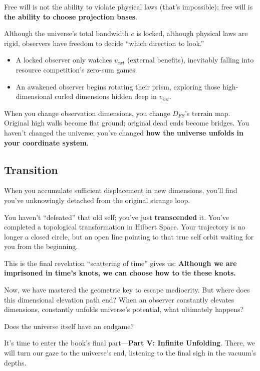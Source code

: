 \documentclass[11pt,a4paper,twoside]{book}
\begin{document}
Free will is not the ability to violate physical laws (that's impossible); free will is \textbf{the ability to choose projection bases}.

Although the universe's total bandwidth $c$ is locked, although physical laws are rigid, observers have freedom to decide ``which direction to look.''

\begin{itemize}
\item A locked observer only watches $v_{ext}$ (external benefits), inevitably falling into resource competition's zero-sum games.

\item An awakened observer begins rotating their prism, exploring those high-dimensional curled dimensions hidden deep in $v_{int}$.
\end{itemize}

When you change observation dimensions, you change $D_{FS}$'s terrain map. Original high walls become flat ground; original dead ends become bridges. You haven't changed the universe; you've changed \textbf{how the universe unfolds in your coordinate system}.

\subsection{Transition}

When you accumulate sufficient displacement in new dimensions, you'll find you've unknowingly detached from the original strange loop.

You haven't ``defeated'' that old self; you've just \textbf{transcended} it. You've completed a topological transformation in Hilbert Space. Your trajectory is no longer a closed circle, but an open line pointing to that true self orbit waiting for you from the beginning.

This is the final revelation ``scattering of time'' gives us: \textbf{Although we are imprisoned in time's knots, we can choose how to tie these knots.}

Now, we have mastered the geometric key to escape mediocrity. But where does this dimensional elevation path end? When an observer constantly elevates dimensions, constantly unfolds universe's potential, what ultimately happens?

Does the universe itself have an endgame?

It's time to enter the book's final part---\textbf{Part V: Infinite Unfolding}. There, we will turn our gaze to the universe's end, listening to the final sigh in the vacuum's depths.
\end{document}
